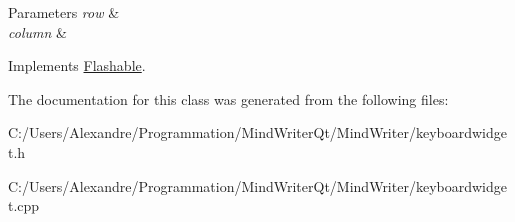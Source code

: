 \begin{DoxyParams}{Parameters}
{\em row} & \\
\hline
{\em column} & \\
\hline
\end{DoxyParams}


Implements \hyperlink{class_flashable}{Flashable}.



The documentation for this class was generated from the following files\-:\begin{DoxyCompactItemize}
\item 
C\-:/\-Users/\-Alexandre/\-Programmation/\-Mind\-Writer\-Qt/\-Mind\-Writer/keyboardwidget.\-h\item 
C\-:/\-Users/\-Alexandre/\-Programmation/\-Mind\-Writer\-Qt/\-Mind\-Writer/keyboardwidget.\-cpp\end{DoxyCompactItemize}
